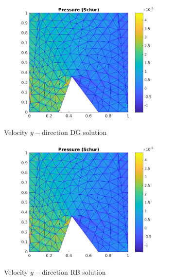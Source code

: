 \documentclass[graybox]{svmult}
\begin{document}
\begin{figure}
\begin{subfigure}{0.31\textwidth}
\includegraphics[width=\linewidth]{offline_pressure_at_43_36.jpg}
\caption{Velocity $y-$direction DG solution} \label{vel_y_dg}
\end{subfigure}\hspace*{\fill}
\begin{subfigure}{0.31\textwidth}
\includegraphics[width=\linewidth]{offline_pressure_at_43_36.jpg}
\caption{Velocity $y-$direction RB solution} \label{vel_y_rb}
\end{subfigure}
\begin{subfigure}{0.31\textwidth}

\end{subfigure}
\end{figure}
\end{document}
